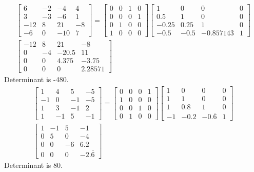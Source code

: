 \documentclass[a4paper,11]{article}
\begin{document}
\begin{multline*}
\begin{bmatrix}
	6 & -2 & -4 & 4\\
	3 & -3 & -6 & 1\\
	-12 & 8 & 21 & -8\\
	-6 & 0 & -10 & 7
\end{bmatrix}=
\begin{bmatrix}
	0 & 0 & 1 & 0\\
	0 & 0 & 0 & 1\\
	0 & 1 & 0 & 0\\
	1 & 0 & 0 & 0
\end{bmatrix}
\begin{bmatrix}
	1 & 0 & 0 & 0\\
	0.5 & 1 & 0 & 0\\
	-0.25 & 0.25 & 1 & 0\\
	-0.5 & -0.5 & -0.857143 & 1
\end{bmatrix}\\
\begin{bmatrix}
	-12 & 8 & 21 & -8\\
	0 & -4 & -20.5 & 11\\
	0 & 0 & 4.375 & -3.75\\
	0 & 0 & 0 & 2.28571
\end{bmatrix}
\end{multline*}
Determinant is -480.
\begin{multline*}
\begin{bmatrix}
	1 & 4 & 5 & -5\\
	-1 & 0 & -1 & -5\\
	1 & 3 & -1 & 2\\
	1 & -1 & 5 & -1
\end{bmatrix}=
\begin{bmatrix}
	0 & 0 & 0 & 1\\
	1 & 0 & 0 & 0\\
	0 & 0 & 1 & 0\\
	0 & 1 & 0 & 0
\end{bmatrix}
\begin{bmatrix}
	1 & 0 & 0 & 0\\
	1 & 1 & 0 & 0\\
	1 & 0.8 & 1 & 0\\
	-1 & -0.2 & -0.\overline{6} & 1
\end{bmatrix}\\
\begin{bmatrix}
	1 & -1 & 5 & -1\\
	0 & 5 & 0 & -4\\
	0 & 0 & -6 & 6.2\\
	0 & 0 & 0 & -2.\overline{6}
\end{bmatrix}
\end{multline*}
Determinant is 80.
\end{document}
